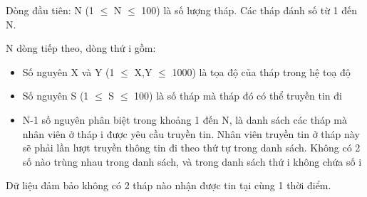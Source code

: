 Dòng đầu tiên: N (1  $\le$  N  $\le$  100) là số lượng tháp. Các tháp đánh số từ 1 đến N.

N dòng tiếp theo, dòng thứ i gồm:
\begin{itemize}
	\item Số nguyên X và Y (1 $\le$ X,Y $\le$ 1000) là tọa độ của tháp trong hệ toạ độ
	\item Số nguyên S (1 $\le$ S $\le$ 100) là số tháp mà tháp đó có thể truyền tin đi
	\item N-1 số nguyên phân biệt trong khoảng 1 đến N, là danh sách các tháp mà nhân viên ở tháp i được yêu cầu truyền tin. Nhân viên truyền tin ở tháp này sẽ phải lần lượt truyền thông tin đi theo thứ tự trong danh sách. Không có 2 số nào trùng nhau trong danh sách, và trong danh sách thứ i không chứa số i
\end{itemize}

Dữ liệu đảm bảo không có 2 tháp nào nhận được tin tại cùng 1 thời điểm.
